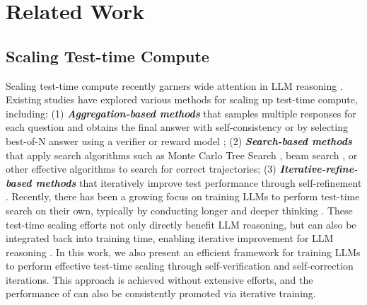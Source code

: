 \section{Related Work}
\subsection{Scaling Test-time Compute}
Scaling test-time compute recently garners wide attention in LLM reasoning \cite{snell2024scalingllmtesttimecompute,wu2024empirical,brown2024large}. Existing studies have explored various methods for scaling up test-time compute, including: (1) \textbf{\textit{Aggregation-based methods}} that samples multiple responses for each question and obtains the final answer with self-consistency \cite{selfconsistency} or by selecting best-of-N answer using a verifier or reward model \cite{mathshepherd,zhang2024generative,lightman2023lets,havrilla2024glore}; (2) \textit{\textbf{Search-based methods}} that apply search algorithms such as Monte Carlo Tree Search \cite{alphallm,wang2024qimprovingmultistepreasoning,restmcts,qi2024mutual}, beam search \cite{snell2024scalingllmtesttimecompute}, or other effective algorithms \cite{feng2023alphazero,yao2023tree} to search for correct trajectories; (3) \textit{\textbf{Iterative-refine-based  methods}} that iteratively improve test performance through self-refinement \cite{selfrefine,shinn2024reflexion,chen2024magicore,chen2025sets}. Recently, there has been a growing focus on training LLMs to perform test-time search on their own, typically by conducting longer and deeper thinking \cite{o1,guo2025deepseek}. 
These test-time scaling efforts not only directly benefit LLM reasoning, but can also be integrated back into training time, enabling iterative improvement for LLM reasoning \cite{qin2024o1,feng2023alphazero,snell2024scalingllmtesttimecompute,luong2024reft}. 
In this work, we also present an efficient framework for training LLMs to perform effective test-time scaling through self-verification and self-correction iterations. This approach is achieved without extensive efforts, and the performance of \modelx can also be consistently promoted via iterative training.

